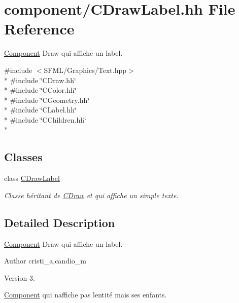 \hypertarget{_c_draw_label_8hh}{}\section{component/\+C\+Draw\+Label.hh File Reference}
\label{_c_draw_label_8hh}


\hyperlink{class_component}{Component} Draw qui affiche un label.  


{\ttfamily \#include $<$S\+F\+M\+L/\+Graphics/\+Text.\+hpp$>$}\\*
{\ttfamily \#include \char`\"{}C\+Draw.\+hh\char`\"{}}\\*
{\ttfamily \#include \char`\"{}C\+Color.\+hh\char`\"{}}\\*
{\ttfamily \#include \char`\"{}C\+Geometry.\+hh\char`\"{}}\\*
{\ttfamily \#include \char`\"{}C\+Label.\+hh\char`\"{}}\\*
{\ttfamily \#include \char`\"{}C\+Children.\+hh\char`\"{}}\\*
\subsection*{Classes}
\begin{DoxyCompactItemize}
\item 
class \hyperlink{class_c_draw_label}{C\+Draw\+Label}
\begin{DoxyCompactList}\small\item\em Classe héritant de \hyperlink{class_c_draw}{C\+Draw} et qui affiche un simple texte. \end{DoxyCompactList}\end{DoxyCompactItemize}


\subsection{Detailed Description}
\hyperlink{class_component}{Component} Draw qui affiche un label. 

\begin{DoxyAuthor}{Author}
cristi\+\_\+a,candio\+\_\+m 
\end{DoxyAuthor}
\begin{DoxyVersion}{Version}
3.
\end{DoxyVersion}
\hyperlink{class_component}{Component} qui n\textquotesingle{}affiche pas l\textquotesingle{}entité mais ses enfants. 